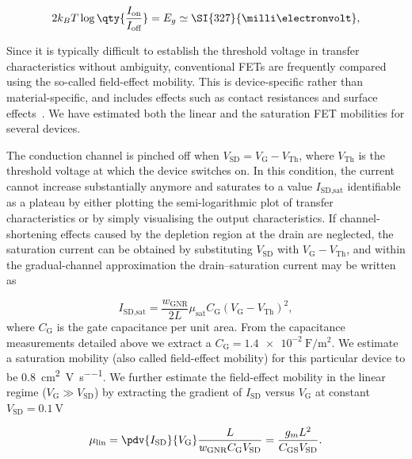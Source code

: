 \begin{equation}
    2k_BT\log{\qty{\frac{I_\textrm{on}}{I_\textrm{off}}}=E_g\simeq\SI{327}{\milli\electronvolt}},
    \label{eq:on_off_ratio_bandgap}
\end{equation}

Since it is typically difficult to establish the threshold voltage in transfer characteristics without ambiguity, conventional \glspl{FET} are frequently compared using the so-called field-effect mobility. This is device-specific rather than material-specific, and includes effects such as contact resistances and surface effects~\cite{durkop2004extraordinary}. We have estimated both the linear and the saturation \gls{FET} mobilities for several devices.

The conduction channel is pinched off when $V_\textrm{SD} = V_\textrm{G} - V_\textrm{Th}$, where $V_\textrm{Th}$ is the threshold voltage at which the device switches on. In this condition, the current cannot increase substantially anymore and saturates to a value $I_\textrm{SD,sat}$ identifiable as a plateau by either plotting the semi-logarithmic plot of  transfer characteristics or by simply visualising the output characteristics. If channel-shortening effects caused by the depletion region at the drain are neglected, the saturation current can be obtained by substituting $V_\textrm{SD}$ with $V_\textrm{G} - V_\textrm{Th}$, and within the gradual-channel approximation the drain–saturation current may be written as~\cite{zaumseil2007electron}

\begin{equation}
    I_\textrm{SD,sat} = \frac{w_\textrm{GNR}}{2L}\mu_\textrm{sat}C_\textrm{G}(V_\textrm{G}-V_\textrm{Th})^2,
\end{equation}
%
where $C_\textrm{G}$ is the gate capacitance per unit area. From the capacitance measurements detailed above we extract a $C_\textrm{G}=\SI{1.4e-2}{\farad\per\metre\squared}$. We estimate a saturation mobility (also called field-effect mobility) for this particular device to be \SI{0.8}{\centi\metre\squared\per\volt\per\second}. We further estimate the field-effect mobility in the linear regime ($V_\textrm{G}\gg V_\textrm{SD}$) by extracting the gradient of $I_\textrm{SD}$ versus $V_\textrm{G}$ at constant $V_\textrm{SD}=\SI{0.1}{\volt}$

\begin{equation}
    \mu_\textrm{lin} = \pdv{I_\textrm{SD}}{V_\textrm{G}}\frac{L}{w_\textrm{GNR}C_\textrm{G}V_\textrm{SD}}=\frac{g_mL^2}{C_\textrm{GS}V_\textrm{SD}}.
\end{equation}

